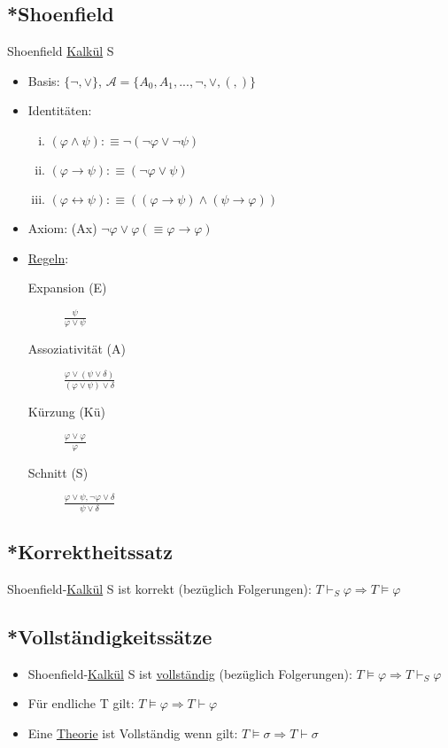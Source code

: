 \documentclass[12pt,a4paper]{article} %
\begin{document}
	\subsection{*Shoenfield}
	Shoenfield \hyperref[Kalkul]{Kalkül} S
	\begin{itemize}
		\item Basis: $\{\neg, \lor\}$, $\mathcal{A} = \{A_0, A_1, ..., \neg, \lor, (, )\}$
		\item Identitäten: \begin{enumerate}[(i)]
			\item $(\varphi \land \psi) :\equiv \neg (\neg \varphi \lor \neg \psi)$ 
			\item $(\varphi \rightarrow \psi) :\equiv (\neg \varphi \lor \psi)$
			\item $(\varphi \leftrightarrow \psi) :\equiv ((\varphi \rightarrow \psi) \land (\psi \rightarrow \varphi))$
		\end{enumerate}
		\item Axiom: (Ax) $\neg \varphi \lor \varphi (\equiv \varphi \rightarrow \varphi)$
		\item \hyperref[Kalkul]{Regeln}: \begin{description}
			\item[Expansion (E)] $\frac{\psi}{\varphi \lor \psi}$
			\item[Assoziativität (A)] $\frac{\varphi \lor (\psi \lor \delta)}{(\varphi \lor \psi) \lor \delta}$
			\item [Kürzung (Kü)] $\frac{\varphi \lor \varphi}{\varphi}$
			\item [Schnitt (S)] $\frac{\varphi \lor \psi, \neg \varphi \lor \delta}{\psi \lor \delta}$
		\end{description}
	\end{itemize}
	
	\subsection{*Korrektheitssatz}
	Shoenfield-\hyperref[Kalkul]{Kalkül} S ist korrekt (bezüglich Folgerungen): $T \hyperref[Beweisbar]{\vdash_S} \varphi \Rightarrow T \hyperref[Erfullbar]{\vDash} \varphi$
	
	\subsection{*Vollständigkeitssätze}
	\label{TheorieVollstandig}
	\begin{itemize}
		\item Shoenfield-\hyperref[Kalkul]{Kalkül} S ist \hyperref[ALVollstandig]{vollständig} (bezüglich Folgerungen): $T \hyperref[Erfullbar]{\vDash} \varphi \Rightarrow T \hyperref[Beweisbar]{\vdash_S} \varphi$
		\item Für endliche T gilt: $T \hyperref[Erfullbar]{\vDash} \varphi \Rightarrow T \hyperref[Beweisbar]{\vdash} \varphi$
		\item Eine \hyperref[Theorie]{Theorie} ist Vollständig wenn gilt: $T \hyperref[Erfullbar]{\vDash} \sigma \Rightarrow T \hyperref[Beweisbar]{\vdash} \sigma$
	\end{itemize}
	
\end{document}
